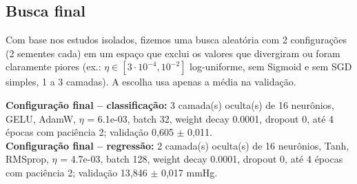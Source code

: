 \documentclass[11pt,a4paper]{article}
\begin{document}
\subsection{Busca final}
Com base nos estudos isolados, fizemos uma busca aleatória com 2 configurações (2 sementes cada) em um espaço
que exclui os valores que divergiram ou foram claramente piores (ex.: $\eta \in [3\cdot10^{-4}, 10^{-2}]$ log-uniforme, sem Sigmoid
e sem SGD simples, 1 a 3 camadas). A escolha usa apenas a média na validação.
\begin{table}[H]\centering\scriptsize{}
\caption{Busca aleatória (2 configurações, 2 sementes cada) -- classificação: 8 melhores na validação.}\label{tab:busca_clf}\end{table}
\begin{table}[H]\centering\scriptsize{}
\caption{Busca aleatória (2 configurações, 2 sementes cada) -- regressão: 8 melhores na validação.}\label{tab:busca_reg}\end{table}

\textbf{Configuração final -- classificação:} 3 camada(s) oculta(s) de 16 neurônios, GELU, AdamW, $\eta$ = 6.1e-03, batch 32, weight decay 0.0001, dropout 0, até 4 épocas com paciência 2; validação 0,605 $\pm$ 0,011.\\
\textbf{Configuração final -- regressão:} 2 camada(s) oculta(s) de 16 neurônios, Tanh, RMSprop, $\eta$ = 4.7e-03, batch 128, weight decay 0.0001, dropout 0, até 4 épocas com paciência 2; validação 13,846 $\pm$ 0,017 mmHg.
\end{document}
